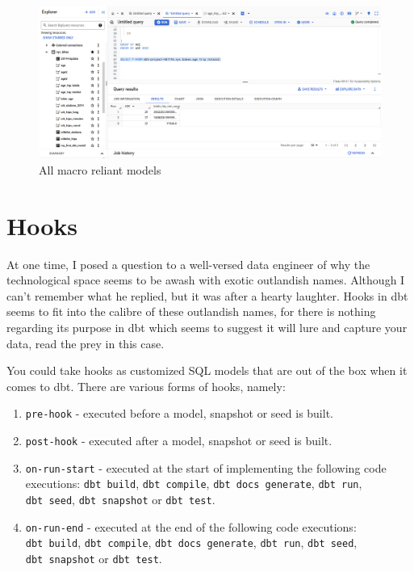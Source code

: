\documentclass[
]{book}
\begin{document}
\begin{figure}
\centering
\includegraphics{./images/macro_reliant.png}
\caption{All macro reliant models}
\end{figure}

\hypertarget{hooks}{%
\chapter{Hooks}\label{hooks}}

At one time, I posed a question to a well-versed data engineer of why the technological space seems to be awash with exotic outlandish names. Although I can't remember what he replied, but it was after a hearty laughter. Hooks in dbt seems to fit into the calibre of these outlandish names, for there is nothing regarding its purpose in dbt which seems to suggest it will lure and capture your data, read the prey in this case.

You could take hooks as customized SQL models that are out of the box when it comes to dbt. There are various forms of hooks, namely:

\begin{enumerate}
\def\labelenumi{\arabic{enumi}.}
\item
  \texttt{pre-hook} - executed before a model, snapshot or seed is built.
\item
  \texttt{post-hook} - executed after a model, snapshot or seed is built.
\item
  \texttt{on-run-start} - executed at the start of implementing the following code executions: \texttt{dbt\ build}, \texttt{dbt\ compile}, \texttt{dbt\ docs\ generate}, \texttt{dbt\ run}, \texttt{dbt\ seed}, \texttt{dbt\ snapshot} or \texttt{dbt\ test}.
\item
  \texttt{on-run-end} - executed at the end of the following code executions: \texttt{dbt\ build}, \texttt{dbt\ compile}, \texttt{dbt\ docs\ generate}, \texttt{dbt\ run}, \texttt{dbt\ seed}, \texttt{dbt\ snapshot} or \texttt{dbt\ test}.
\end{enumerate}
\end{document}
